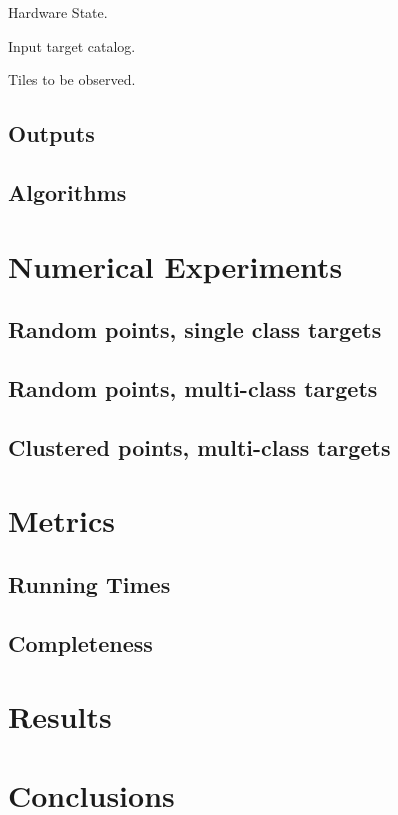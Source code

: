 \documentclass[onecolumn]{aastex63}
\begin{document}
Hardware State.

Input target catalog.

Tiles to be observed.

\subsection{Outputs}

\subsection{Algorithms}

\section{Numerical Experiments}

\subsection{Random points, single class targets}

\subsection{Random points, multi-class targets}

\subsection{Clustered points, multi-class targets}

\section{Metrics}

\subsection{Running Times}

\subsection{Completeness}

\section{Results}

\section{Conclusions}





\end{document}
